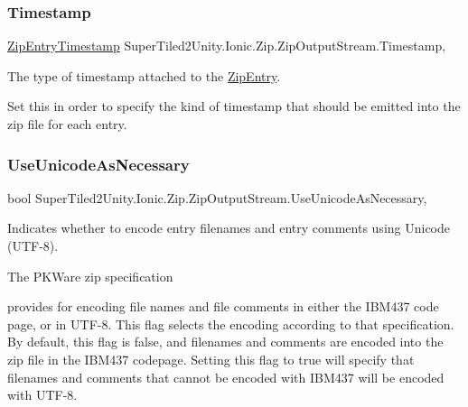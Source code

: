 \subsubsection{\texorpdfstring{Timestamp}{Timestamp}}
{\footnotesize\ttfamily \mbox{\hyperlink{namespace_super_tiled2_unity_1_1_ionic_1_1_zip_afa5034d6b4915c0633b590a28622f7fd}{Zip\+Entry\+Timestamp}} Super\+Tiled2\+Unity.\+Ionic.\+Zip.\+Zip\+Output\+Stream.\+Timestamp\hspace{0.3cm}{\ttfamily [get]}, {\ttfamily [set]}}



The type of timestamp attached to the \mbox{\hyperlink{class_super_tiled2_unity_1_1_ionic_1_1_zip_1_1_zip_entry}{Zip\+Entry}}. 

Set this in order to specify the kind of timestamp that should be emitted into the zip file for each entry. \mbox{\label{class_super_tiled2_unity_1_1_ionic_1_1_zip_1_1_zip_output_stream_a4df145de0a4fefaadaa7e98a308ce1db}} 
\subsubsection{\texorpdfstring{Use\+Unicode\+As\+Necessary}{UseUnicodeAsNecessary}}
{\footnotesize\ttfamily bool Super\+Tiled2\+Unity.\+Ionic.\+Zip.\+Zip\+Output\+Stream.\+Use\+Unicode\+As\+Necessary\hspace{0.3cm}{\ttfamily [get]}, {\ttfamily [set]}}



Indicates whether to encode entry filenames and entry comments using Unicode (U\+T\+F-\/8). 

The P\+K\+Ware zip specification

provides for encoding file names and file comments in either the I\+B\+M437 code page, or in U\+T\+F-\/8. This flag selects the encoding according to that specification. By default, this flag is false, and filenames and comments are encoded into the zip file in the I\+B\+M437 codepage. Setting this flag to true will specify that filenames and comments that cannot be encoded with I\+B\+M437 will be encoded with U\+T\+F-\/8. 

